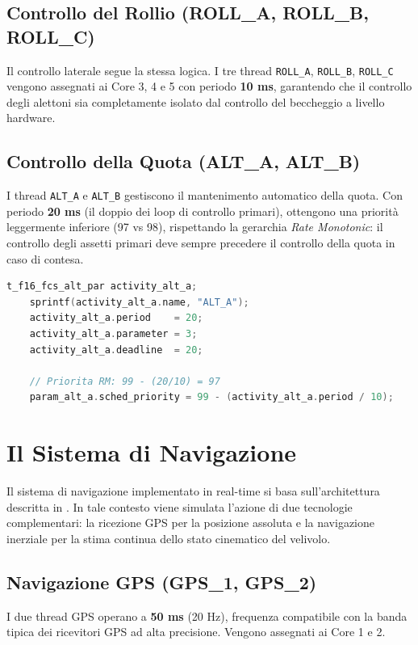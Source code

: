 \subsection{Controllo del Rollio (ROLL\_A, ROLL\_B, ROLL\_C)}
Il controllo laterale segue la stessa logica. I tre thread \texttt{ROLL\_A}, \texttt{ROLL\_B}, \texttt{ROLL\_C} vengono assegnati ai Core 3, 4 e 5 con periodo \textbf{10 ms}, garantendo che il controllo degli alettoni sia completamente isolato dal controllo del beccheggio a livello hardware.

\subsection{Controllo della Quota (ALT\_A, ALT\_B)}
I thread \texttt{ALT\_A} e \texttt{ALT\_B} gestiscono il mantenimento automatico della quota. Con periodo \textbf{20 ms} (il doppio dei loop di controllo primari), ottengono una priorità leggermente inferiore (97 vs 98), rispettando la gerarchia \textit{Rate Monotonic}: il controllo degli assetti primari deve sempre precedere il controllo della quota in caso di contesa.

\begin{lstlisting}[language=C++, caption={Configurazione di ALT\_A: periodo 20 ms, priorità 97}]
	t_f16_fcs_alt_par activity_alt_a;
	sprintf(activity_alt_a.name, "ALT_A");
	activity_alt_a.period    = 20;
	activity_alt_a.parameter = 3;
	activity_alt_a.deadline  = 20;
	
	// Priorita RM: 99 - (20/10) = 97
	param_alt_a.sched_priority = 99 - (activity_alt_a.period / 10);
\end{lstlisting}


\section{Il Sistema di Navigazione}
Il sistema di navigazione implementato in real-time si basa sull'architettura descritta in \cite{Navigation_System}. In tale contesto viene simulata l'azione di due tecnologie complementari: la ricezione GPS per la posizione assoluta e la navigazione inerziale per la stima continua dello stato cinematico del velivolo.

\subsection{Navigazione GPS (GPS\_1, GPS\_2)}
I due thread GPS operano a \textbf{50 ms} (20 Hz), frequenza compatibile con la banda tipica dei ricevitori GPS ad alta precisione. Vengono assegnati ai Core 1 e 2.


